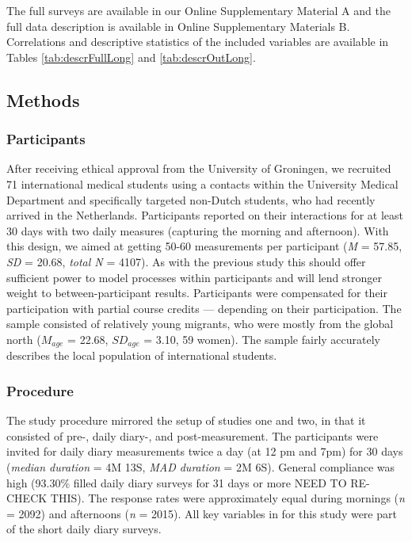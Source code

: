 The full surveys are available in our Online Supplementary Material A
and the full data description is available in Online Supplementary
Materials B. Correlations and descriptive statistics of the included
variables are available in Tables \ref{tab:descrFullLong} and
\ref{tab:descrOutLong}.

\subsection{Methods}

\subsubsection{Participants}

After receiving ethical approval from the University of Groningen, we
recruited 71 international medical students using a contacts within the
University Medical Department and specifically targeted non-Dutch
students, who had recently arrived in the Netherlands. Participants
reported on their interactions for at least 30 days with two daily
measures (capturing the morning and afternoon). With this design, we
aimed at getting 50-60 measurements per participant (\textit{M} = 57.85,
\textit{SD} = 20.68, \textit{total N} = 4107). As with the previous
study this should offer sufficient power to model processes within
participants and will lend stronger weight to between-participant
results. Participants were compensated for their participation with
partial course credits --- depending on their participation. The sample
consisted of relatively young migrants, who were mostly from the global
north (\(M_{age}\) = 22.68, \(SD_{age}\) = 3.10, 59 women). The sample
fairly accurately describes the local population of international
students.

\subsubsection{Procedure}

The study procedure mirrored the setup of studies one and two, in that
it consisted of pre-, daily diary-, and post-measurement. The
participants were invited for daily diary measurements twice a day (at
12 pm and 7pm) for 30 days (\textit{median duration} = 4M 13S,
\textit{MAD duration} = 2M 6S). General compliance was high (93.30\%
filled daily diary surveys for 31 days or more NEED TO RE-CHECK THIS).
The response rates were approximately equal during mornings (\textit{n}
= 2092) and afternoons (\textit{n} = 2015). All key variables in for
this study were part of the short daily diary surveys.

